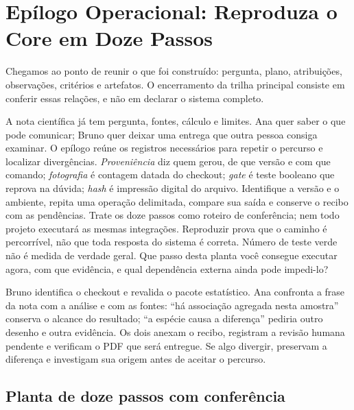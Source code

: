 \chapter{Ep\'ilogo Operacional: Reproduza o Core em Doze Passos}

Chegamos ao ponto de reunir o que foi construído: pergunta, plano, atribuições, observações, critérios e artefatos. O encerramento da trilha principal consiste em conferir essas relações, e não em declarar o sistema completo.


\roteirodidatico
{A nota científica já tem pergunta, fontes, cálculo e limites. Ana quer saber o que pode comunicar; Bruno quer deixar uma entrega que outra pessoa consiga examinar. O epílogo reúne os registros necessários para repetir o percurso e localizar divergências.}
{\emph{Proveni\^encia} diz quem gerou, de que vers\~ao e com que comando; \emph{fotografia} \'e contagem datada do checkout; \emph{gate} \'e teste booleano que reprova na d\'uvida; \emph{hash} \'e impress\~ao digital do arquivo.}
{Identifique a versão e o ambiente, repita uma operação delimitada, compare sua saída e conserve o recibo com as pendências. Trate os doze passos como roteiro de conferência; nem todo projeto executará as mesmas integrações.}
{Reproduzir prova que o caminho \'e percorr\'ivel, n\~ao que toda resposta do sistema \'e correta. N\'umero de teste verde n\~ao \'e medida de verdade geral.}
{Que passo desta planta voc\^e consegue executar agora, com que evid\^encia, e qual depend\^encia externa ainda pode impedi-lo?}

{Bruno identifica o checkout e revalida o pacote estatístico. Ana confronta a frase da nota com a análise e com as fontes: ``há associação agregada nesta amostra'' conserva o alcance do resultado; ``a espécie causa a diferença'' pediria outro desenho e outra evidência. Os dois anexam o recibo, registram a revisão humana pendente e verificam o PDF que será entregue. Se algo divergir, preservam a diferença e investigam sua origem antes de aceitar o percurso.}

\section{Planta de doze passos com confer\^encia}

